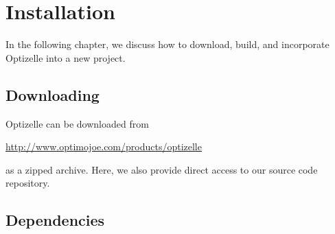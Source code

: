 \documentclass{report}
\begin{document}
\chapter{Installation}\label{ch:Install}

        In the following chapter, we discuss how to download, build, and incorporate Optizelle into a new project.

\section{Downloading}

        Optizelle can be downloaded from
\begin{center}
    \mbox{\url{http://www.optimojoe.com/products/optizelle}}
\end{center}
as a zipped archive.  Here, we also provide direct access to our source code repository.

\section{Dependencies}
\end{document}
